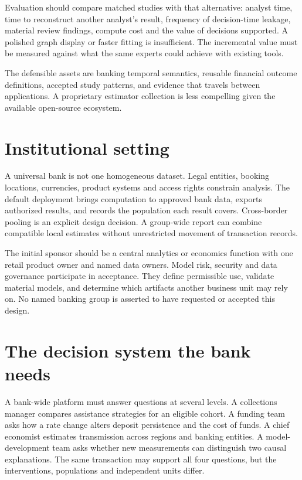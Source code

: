 Evaluation should compare matched studies with that alternative: analyst time,
time to reconstruct another analyst's result, frequency of decision-time
leakage, material review findings, compute cost and the value of decisions
supported. A polished graph display or faster fitting is insufficient.
The incremental value must be measured against what the same experts could
achieve with existing tools.

The defensible assets are banking temporal semantics, reusable
financial outcome definitions, accepted study patterns, and
evidence that travels between applications. A proprietary estimator collection
is less compelling given the available open-source ecosystem.

\section{Institutional setting}
A universal bank is not one homogeneous dataset. Legal entities, booking
locations, currencies, product systems and access rights constrain analysis.
The default deployment brings computation to approved bank data,
exports authorized results, and records the population each result
covers. Cross-border pooling is an explicit design decision. A group-wide
report can combine compatible local estimates without unrestricted
movement of transaction records.

The initial sponsor should be a central analytics or economics function with
one retail product owner and named data owners. Model risk, security and data
governance participate in acceptance. They define permissible
use, validate material models, and determine which artifacts another business
unit may rely on. No named banking group is asserted to have requested or
accepted this design.

\section{The decision system the bank needs}
A bank-wide platform must answer questions at several levels. A collections
manager compares assistance strategies for an eligible cohort. A funding team
asks how a rate change alters deposit persistence and the cost of funds. A
chief economist estimates transmission across regions and banking entities.
A model-development team asks whether new measurements can distinguish two
causal explanations. The same transaction may support all four questions,
but the interventions, populations and independent units differ.

